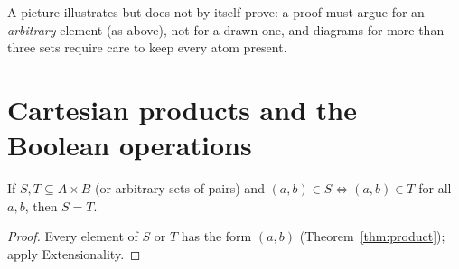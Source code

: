 \begin{warning}
	A picture illustrates but does not by itself prove: a proof must argue for an \emph{arbitrary} element (as above), not for a drawn one, and diagrams for more than three sets require care to keep every atom present.
\end{warning}

\section{Cartesian products and the Boolean operations}

\begin{lemma}\label{lem:pairprinciple}
	If $S,T\subseteq A\times B$ (or arbitrary sets of pairs) and $(a,b)\in S\iff(a,b)\in T$ for all $a,b$, then $S=T$.
\end{lemma}
\begin{proof}
	Every element of $S$ or $T$ has the form $(a,b)$ (Theorem~\ref{thm:product}); apply Extensionality.
\end{proof}

